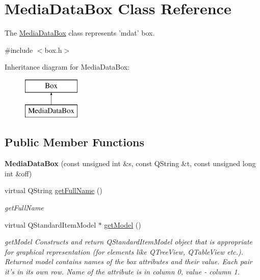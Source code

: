 \hypertarget{class_media_data_box}{\section{Media\-Data\-Box Class Reference}
\label{class_media_data_box}
}


The \hyperlink{class_media_data_box}{Media\-Data\-Box} class represents 'mdat' box.  




{\ttfamily \#include $<$box.\-h$>$}

Inheritance diagram for Media\-Data\-Box\-:\begin{figure}[H]
\begin{center}
\leavevmode
\includegraphics[height=2.000000cm]{class_media_data_box}
\end{center}
\end{figure}
\subsection*{Public Member Functions}
\begin{DoxyCompactItemize}
\item 
\hypertarget{class_media_data_box_a6ecfd1ac7f37b534cbdb4a72ed660cb1}{{\bfseries Media\-Data\-Box} (const unsigned int \&s, const Q\-String \&t, const unsigned long int \&off)}\label{class_media_data_box_a6ecfd1ac7f37b534cbdb4a72ed660cb1}

\item 
virtual Q\-String \hyperlink{class_media_data_box_a76ca0bfdfb66583db91784dd4d8e8ccb}{get\-Full\-Name} ()
\begin{DoxyCompactList}\small\item\em get\-Full\-Name \end{DoxyCompactList}\item 
virtual Q\-Standard\-Item\-Model $\ast$ \hyperlink{class_media_data_box_af92d93a0b4a5d2051188ea0f7d555978}{get\-Model} ()
\begin{DoxyCompactList}\small\item\em get\-Model Constructs and return Q\-Standard\-Item\-Model object that is appropriate for graphical representation (for elements like Q\-Tree\-View, Q\-Table\-View etc.). Returned model contains names of the box attributes and their value. Each pair it's in its own row. Name of the attribute is in column 0, value -\/ column 1. \end{DoxyCompactList}\end{DoxyCompactItemize}
